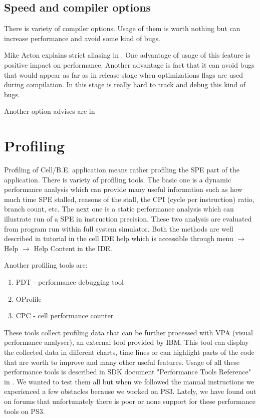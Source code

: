 \subsection {Speed and compiler options}

\par
There is variety of compiler options.
Usage of them is worth nothing but can increase performance and avoid some kind of bugs.

\par
Mike Acton explains strict aliasing in \cite{strictAliasing}.
One advantage of usage of this feature is positive impact on performance.
Another advantage is fact that it can avoid bugs that would appear as far as in release stage when optimizations flags are used during compilation.
In this stage is really hard to track and debug this kind of bugs.

\par
Another option advises are in \cite{compilerOptions}

\section{Profiling}

\par
Profiling of \mbox{Cell/B.E.} application means rather profiling the SPE part of the application.
There is variety of profiling tools.
The basic one is a dynamic performance analysis which can provide many useful information such as how much time SPE stalled, reasons of the stall, the CPI (cycle per instruction) ratio, branch count, etc.
The next one is a static performance analysis which can illustrate run of a SPE in instruction precision.
These two analysis are evaluated from program run within full system simulator.
Both the methods are well described in tutorial in the cell IDE help which is accessible through menu $\rightarrow$ Help $\rightarrow$ Help Content in the IDE.

\par
Another profiling tools are:
\begin{enumerate}
\item{PDT - performance debugging tool}
\item{OProfile}
\item{CPC - cell performance counter}
\end{enumerate}

These tools collect profiling data that can be further processed with VPA (visual performance analyser), an external tool provided by IBM.
This tool can display the collected data in different charts, time lines or can highlight parts of the code that are worth to improve and many other useful features.
Usage of all these performance tools is described in SDK document "Performance Tools Reference" in \cite{performanceToolRef}.
We wanted to test them all but when we followed the manual instructions we experienced a few obstacles because we worked on PS3.
Lately, we have found out on forums that unfortunately there is poor or none support for these performance tools on PS3.
